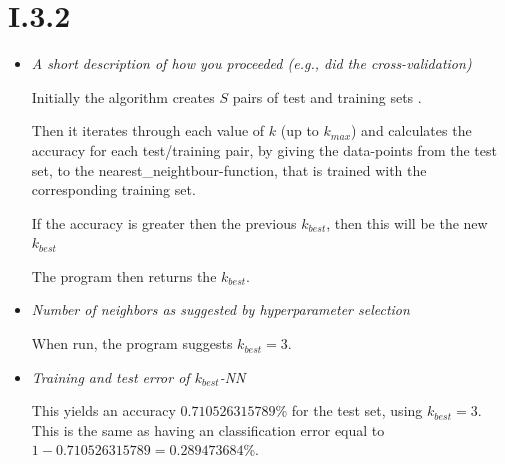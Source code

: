 \documentclass[12pt, a4paper]{article}
\begin{document}
\section{I.3.2}
\begin{itemize}
\item \textit{A short description of how you proceeded (e.g., did the
cross-validation)}

Initially the algorithm creates $S$ pairs of test and training sets .

Then it iterates through each value of $k$ (up to $k_{max}$) and calculates the accuracy for each test/training pair, by giving the data-points from the test set, to the nearest\_neightbour-function, that is trained with the corresponding training set.

If the accuracy is greater then the previous $k_{best}$, then this will be the new $k_{best}$

The program then returns the $k_{best}$.

\item \textit{Number of neighbors as suggested by hyperparameter selection}

When run, the program suggests $k_{best} = 3$.

\item \textit{Training and test error of $k_{best}$-NN}

This yields an accuracy $0.710526315789$\% for the test set, using $k_{best} = 3$. This is the same as having an classification error equal to $1 - 0.710526315789 = 0.289473684$\%. 

\end{itemize}
\end{document}
